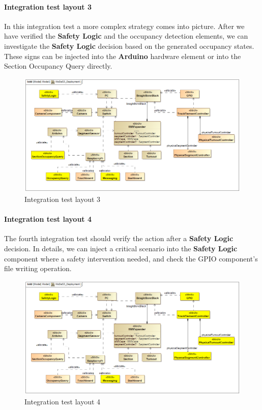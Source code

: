 \paragraph{Integration test layout 3}
In this integration test a more complex strategy comes into picture. After we have verified the \textbf{Safety Logic} and the occupancy detection elements, we can investigate the \textbf{Safety Logic} decision based on the generated occupancy states. These signs can be injected into the \textbf{Arduino} hardware element or into the Section Occupancy Query directly.
\begin{figure}[!h]
	\centering
	\includegraphics[width=150mm, keepaspectratio]{figures/testDesign/testLayoutSYSML/MoDeS3_Deployment-test3.png}
	\caption{Integration test layout 3}
	\label{fig:MoDeS3_Deployment-test3}
\end{figure}

\paragraph{Integration test layout 4}
The fourth integration test should verify the action after a \textbf{Safety Logic} decision. In details, we can inject a critical scenario into the \textbf{Safety Logic} component where a safety intervention needed, and check the GPIO component's file writing operation.
\begin{figure}[!h]
	\centering
	\includegraphics[width=150mm, keepaspectratio]{figures/testDesign/testLayoutSYSML/MoDeS3_Deployment-test4.png}
	\caption{Integration test layout 4}
	\label{fig:MoDeS3_Deployment-test4}
\end{figure}

